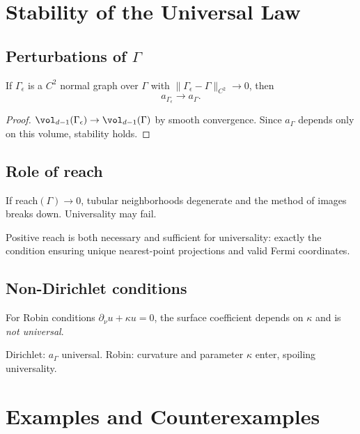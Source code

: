 \section{Stability of the Universal Law}
\label{sec:stability}

\subsection{Perturbations of $\Gamma$}
\begin{proposition}
If $\Gamma_\epsilon$ is a $C^2$ normal graph over $\Gamma$ with $\|\Gamma_\epsilon-\Gamma\|_{C^2}\to 0$, then
\[
a_{\Gamma_\epsilon}\to a_\Gamma.
\]
\end{proposition}

\begin{proof}
$\vol_{d-1}(\Gamma_\epsilon)\to\vol_{d-1}(\Gamma)$ by smooth convergence. Since $a_\Gamma$ depends only on this volume, stability holds.
\end{proof}

\subsection{Role of reach}
If reach$(\Gamma)\to 0$, tubular neighborhoods degenerate and the method of images breaks down. Universality may fail.

\begin{remark}
Positive reach is both necessary and sufficient for universality: exactly the condition ensuring unique nearest-point projections and valid Fermi coordinates.
\end{remark}

\subsection{Non-Dirichlet conditions}
For Robin conditions $\partial_\nu u+\kappa u=0$, the surface coefficient depends on $\kappa$ and is \emph{not universal}.

\begin{remark}
Dirichlet: $a_\Gamma$ universal. Robin: curvature and parameter $\kappa$ enter, spoiling universality.
\end{remark}

\section{Examples and Counterexamples}
\label{sec:examples}

